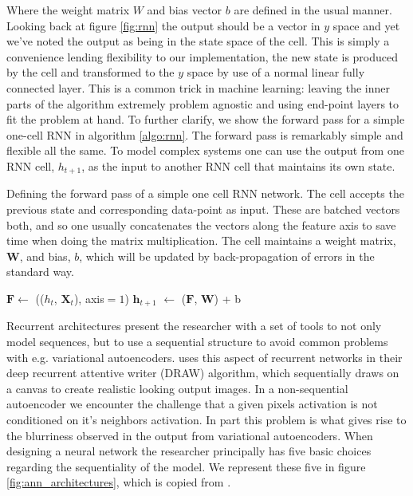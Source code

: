 \noindent Where the weight matrix $W$ and bias vector $b$ are defined in the usual manner. Looking back at figure \ref{fig:rnn} the output should be a vector in $y$ space and yet we've noted the output as being in the state space of the cell. This is simply a convenience lending flexibility to our implementation, the new state is produced by the cell and transformed to the $y$ space by use of a normal linear fully connected layer. This is a common trick in machine learning: leaving the inner parts of the algorithm extremely problem agnostic and using end-point layers to fit the problem at hand. To further clarify, we show the forward pass for a simple one-cell RNN in algorithm \ref{algo:rnn}. The forward pass is remarkably simple and flexible all the same. To model complex systems one can use the output from one RNN cell, $h_{t+1}$, as the input to another RNN cell that maintains its own state. 

\begin{algorithm}[H]
\SetAlgoLined
\caption{Defining the forward pass of a simple one cell RNN network. The cell accepts the previous state and corresponding data-point as input. These are batched vectors both, and so one usually concatenates the vectors along the feature axis to save time when doing the matrix multiplication. The cell maintains a weight matrix, $\mathbf{W}$, and bias, $b$, which will be updated by back-propagation of errors in the standard way.}\label{algo:rnn}
$\mathbf{F} \gets$ (($h_t$, $\mathbf{X}_t$), axis$=1$)\;
$\mathbf{h}_{t+1}$ $\gets$ ($\mathbf{F}$, $\mathbf{W}$) + b\;
\end{algorithm}

\noindent Recurrent architectures present the researcher with a set of tools to not only model sequences, but to use a sequential structure to avoid common problems with e.g. variational autoencoders. \citet{Gregor2015} uses this aspect of recurrent networks in their deep recurrent attentive writer (DRAW) algorithm, which sequentially draws on a canvas to create realistic looking output images. In a non-sequential autoencoder we encounter the challenge that a given pixels activation is not conditioned on it's neighbors activation. In part this problem is what gives rise to the blurriness observed in the output from variational autoencoders. When designing a neural network the researcher principally has five basic choices regarding the sequentiality of the model. We represent these five in figure \ref{fig:ann_architectures}, which is copied from \citet{Karpathy2015}.

